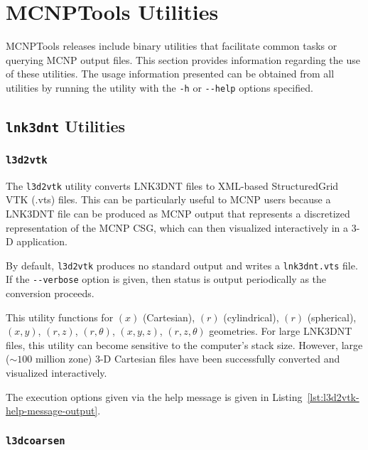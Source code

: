 \documentclass[11pt]{article}
\begin{document}
\section{MCNPTools Utilities}\label{mcnptools-utilities}

MCNPTools releases include binary utilities that facilitate common tasks or
querying MCNP output files. This section provides information regarding the use
of these utilities. The usage information presented can be obtained from all
utilities by running the utility with the \texttt{-h} or \texttt{-\/-help}
options specified.

\subsection{\texttt{lnk3dnt} Utilities}

\subsubsection{\texttt{l3d2vtk}}\label{sec:l3d2vtk}

The \texttt{l3d2vtk} utility converts LNK3DNT files to XML-based
StructuredGrid VTK (.vts) files. This can be particularly useful to MCNP
users because a LNK3DNT file can be produced as MCNP output that
represents a discretized representation of the MCNP CSG, which can then
visualized interactively in a 3-D application.

By default, \texttt{l3d2vtk} produces no standard output and writes a
\texttt{lnk3dnt.vts} file. If the \texttt{-\/-verbose} option is given,
then status is output periodically as the conversion proceeds.

This utility functions for $\left(x\right)$ (Cartesian), $\left(r\right)$
(cylindrical), $\left(r\right)$ (spherical), $\left(x,y\right)$,
$\left(r,z\right)$, $\left(r,\theta\right)$, $\left(x,y,z\right)$,
$\left(r,z,\theta\right)$ geometries. For large LNK3DNT files, this utility can
become sensitive to the computer's stack size. However, large ($\sim100$ million
zone) 3-D Cartesian files have been successfully converted and visualized
interactively.

The execution options given via the help message is given in
Listing~\ref{lst:l3d2vtk-help-message-output}.

\subsubsection{\texttt{l3dcoarsen}}\label{sec:l3dcoarsen}
\end{document}
